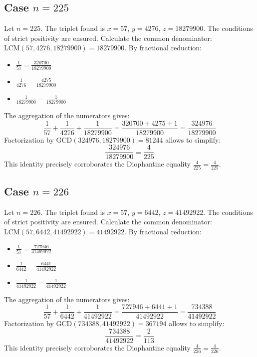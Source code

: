 \documentclass[11pt,a4paper]{article}
\begin{document}
\subsection{Case $n = 225$}
Let $n = 225$. The triplet found is $x = 57$, $y = 4276$, $z = 18279900$.
The conditions of strict positivity are ensured.
Calculate the common denominator: $\text{LCM}(57, 4276, 18279900) = 18279900$.
By fractional reduction:
\begin{itemize}
    \item $\frac{1}{57} = \frac{320700}{18279900}$
    \item $\frac{1}{4276} = \frac{4275}{18279900}$
    \item $\frac{1}{18279900} = \frac{1}{18279900}$
\end{itemize}
The aggregation of the numerators gives:
$$ \frac{1}{57} + \frac{1}{4276} + \frac{1}{18279900} = \frac{320700 + 4275 + 1}{18279900} = \frac{324976}{18279900} $$
Factorization by $\text{GCD}(324976, 18279900) = 81244$ allows to simplify:
$$ \frac{324976}{18279900} = \frac{4}{225} $$
This identity precisely corroborates the Diophantine equality $\frac{4}{225} = \frac{4}{225}$.

\subsection{Case $n = 226$}
Let $n = 226$. The triplet found is $x = 57$, $y = 6442$, $z = 41492922$.
The conditions of strict positivity are ensured.
Calculate the common denominator: $\text{LCM}(57, 6442, 41492922) = 41492922$.
By fractional reduction:
\begin{itemize}
    \item $\frac{1}{57} = \frac{727946}{41492922}$
    \item $\frac{1}{6442} = \frac{6441}{41492922}$
    \item $\frac{1}{41492922} = \frac{1}{41492922}$
\end{itemize}
The aggregation of the numerators gives:
$$ \frac{1}{57} + \frac{1}{6442} + \frac{1}{41492922} = \frac{727946 + 6441 + 1}{41492922} = \frac{734388}{41492922} $$
Factorization by $\text{GCD}(734388, 41492922) = 367194$ allows to simplify:
$$ \frac{734388}{41492922} = \frac{2}{113} $$
This identity precisely corroborates the Diophantine equality $\frac{4}{226} = \frac{4}{226}$.
\end{document}
